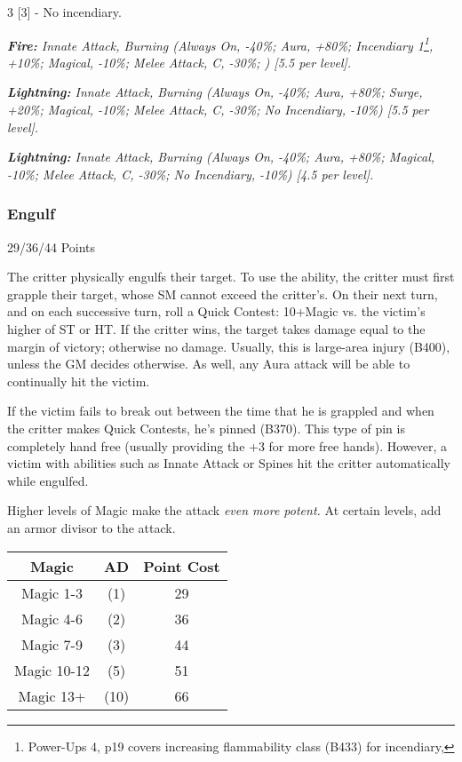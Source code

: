 \begin{multicols*}{3}
	[3] - No incendiary.
	
	\textcolor{OliveGreen}{\textit{\textbf{Fire:} Innate Attack, Burning (Always On, -40\%; Aura, +80\%; Incendiary 1\footnote{Power-Ups 4, p19 covers increasing flammability class (B433) for incendiary,}, +10\%; Magical, -10\%; Melee Attack, C, -30\%; ) [5.5 per level].}}
	
	\textcolor{OliveGreen}{\textit{\textbf{Lightning:} Innate Attack, Burning (Always On, -40\%; Aura, +80\%; Surge, +20\%; Magical, -10\%; Melee Attack, C, -30\%; No Incendiary, -10\%) [5.5 per level].}}
	
	\textcolor{OliveGreen}{\textit{\textbf{Lightning:} Innate Attack, Burning (Always On, -40\%; Aura, +80\%; Magical, -10\%; Melee Attack, C, -30\%; No Incendiary, -10\%) [4.5 per level].}}
	
	
	\subsubsection{Engulf}\label{engulf}
	\begin{flushright}
		29/36/44 Points
	\end{flushright}
	
	The critter physically engulfs their target. To use the ability, the critter must first grapple their target, whose SM cannot exceed the critter's. On their next turn, and on each successive turn, roll a Quick Contest: 10+Magic vs. the victim's higher of ST or HT. If the critter wins, the target takes damage equal to the margin of victory; otherwise no damage. Usually, this is large-area injury (B400), unless the GM decides otherwise. As well, any Aura attack will be able to continually hit the victim.
	
	If the victim fails to break out between the time that he is grappled and when the critter makes Quick Contests, he's pinned (B370). This type of pin is completely hand free (usually providing the +3 for more free hands). However, a victim with abilities such as Innate Attack or Spines hit the critter automatically while engulfed.
	
	Higher levels of Magic make the attack \textit{even more potent.} At certain levels, add an armor divisor to the attack.
	
	\begin{center}
		\begin{tabular}{|c|c|c|}
			\hline
			Magic & AD & Point Cost\\
			\hline
			\hline
			Magic 1-3 & (1) & 29 \\
			Magic 4-6 & (2) & 36 \\
			Magic 7-9 & (3) & 44 \\
			Magic 10-12 & (5) & 51 \\
			Magic 13+ & (10) & 66 \\
			\hline
		\end{tabular}
	\end{center}
	

\end{multicols*}
